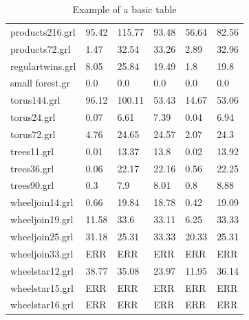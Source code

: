 \documentclass[11pt]{article}
\begin{document}
\begin{table}[h!]
\begin{tabularx}{\textwidth}{|l|X|X|X|X|X|}
		products216.grl & 95.42 & 115.77 & 93.48 & 56.64 & 82.56 \\
		products72.grl & 1.47 & 32.54 & 33.26 & 2.89 & 32.96 \\
		regulartwins.grl & 8.05 & 25.84 & 19.49 & 1.8 & 19.8 \\
		small forest.gr & 0.0 & 0.0 & 0.0 & 0.0 & 0.0 \\
		torus144.grl & 96.12 & 100.11 & 53.43 & 14.67 & 53.06 \\
		torus24.grl & 0.07 & 6.61 & 7.39 & 0.04 & 6.94 \\
		torus72.grl & 4.76 & 24.65 & 24.57 & 2.07 & 24.3 \\
		trees11.grl & 0.01 & 13.37 & 13.8 & 0.02 & 13.92 \\
		trees36.grl & 0.06 & 22.17 & 22.16 & 0.56 & 22.25 \\
		trees90.grl & 0.3 & 7.9 & 8.01 & 0.8 & 8.88 \\
		wheeljoin14.grl & 0.66 & 19.84 & 18.78 & 0.42 & 19.09 \\
		wheeljoin19.grl & 11.58 & 33.6 & 33.11 & 6.25 & 33.33 \\
		wheeljoin25.grl & 31.18 & 25.31 & 33.33 & 20.33 & 25.31 \\
		wheeljoin33.grl & ERR & ERR & ERR & ERR & ERR \\
		wheelstar12.grl & 38.77 & 35.08 & 23.97 & 11.95 & 36.14 \\
		wheelstar15.grl & ERR & ERR & ERR & ERR & ERR \\
		wheelstar16.grl & ERR & ERR & ERR & ERR & ERR \\
        \hline
    \end{tabularx}
    \caption{Example of a basic table}
    \label{tab:1}
\end{table}
\end{document}
